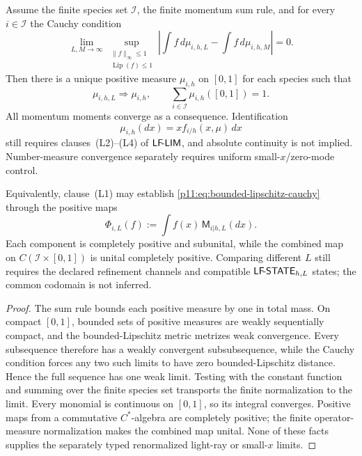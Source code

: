 \documentclass[12pt,a4paper]{article}
\begin{document}
\begin{theorem}
\label{p11:thm:bounded-lipschitz-pdf-limit}
Assume the finite species set \(\mathcal I\), the finite momentum sum rule, and
for every \(i\in\mathcal I\) the Cauchy condition
\begin{equation}
\label{p11:eq:bounded-lipschitz-cauchy}
 \lim_{L,M\to\infty}
 \sup_{\substack{\|f\|_\infty\le1\\
                  \operatorname{Lip}(f)\le1}}
 \left|
 \int f\,d\mu_{i,h,L}-\int f\,d\mu_{i,h,M}
 \right|=0 .
\end{equation}
Then there is a unique positive measure \(\mu_{i,h}\) on \([0,1]\) for each
species such that
\[
 \mu_{i,h,L}\Rightarrow\mu_{i,h},
 \qquad
 \sum_{i\in\mathcal I}\mu_{i,h}([0,1])=1.
\]
All momentum moments converge as a consequence. Identification
\[
\mu_{i,h}(dx)=x f_{i/h}(x,\mu)\,dx
\]
still requires clauses~\textnormal{(L2)--(L4)} of \(\mathsf{LF\!\mbox{-}LIM}\), and absolute
continuity is not implied. Number-measure convergence separately requires
uniform small-\(x\)/zero-mode control.

Equivalently, clause~\textnormal{(L1)} may establish
\eqref{p11:eq:bounded-lipschitz-cauchy} through the positive maps
\[
 \Phi_{i,L}(f):=\int f(x)\,\mathsf M_{i|h,L}(dx).
\]
Each component is completely positive and subunital, while the combined map
on \(C(\mathcal I\times[0,1])\) is unital completely positive.  Comparing
different \(L\) still requires the declared refinement channels and compatible
\(\mathsf{LF\!\mbox{-}STATE}_{h,L}\) states; the common codomain is not inferred.
\end{theorem}

\begin{proof}
The sum rule bounds each positive measure by one in total mass.  On compact
\([0,1]\), bounded sets of positive measures are weakly sequentially compact,
and the bounded-Lipschitz metric metrizes weak convergence.  Every subsequence
therefore has a weakly convergent subsubsequence, while the Cauchy condition
forces any two such limits to have zero bounded-Lipschitz distance.  Hence the
full sequence has one weak limit.  Testing with the constant function and
summing over the finite species set transports the finite normalization to the
limit.  Every monomial is continuous on \([0,1]\), so its integral converges.
Positive maps from a commutative \(C^*\)-algebra are completely positive; the
finite operator-measure normalization makes the combined map unital.  None of
these facts supplies the separately typed renormalized light-ray or
small-\(x\) limits.
\end{proof}
\end{document}
